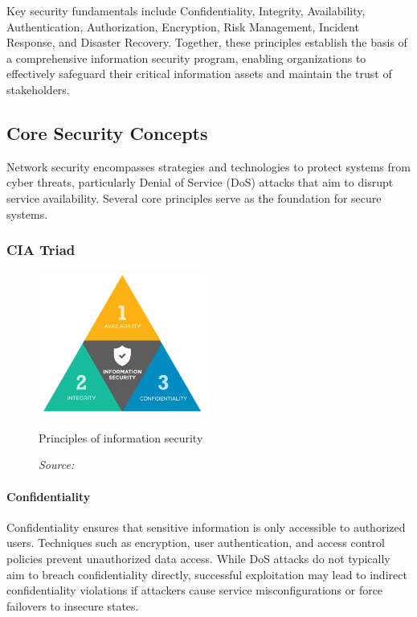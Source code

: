 \documentclass[16pt]{report}
\begin{document}
Key security fundamentals include Confidentiality, Integrity, Availability, Authentication, Authorization, Encryption, Risk Management, Incident Response, and Disaster Recovery. Together, these principles establish the basis of a comprehensive information security program, enabling organizations to effectively safeguard their critical information assets and maintain the trust of stakeholders.\cite{ibm_security_fundamental}

\subsection{Core Security Concepts}
Network security encompasses strategies and technologies to protect systems from cyber threats, particularly Denial of Service (DoS) attacks that aim to disrupt service availability. Several core principles serve as the foundation for secure systems.

\subsubsection{CIA Triad}
\begin{figure}[ht]
    \centering
    \includegraphics[width=0.5\textwidth]{images/CIA-graph.png}
    \caption{Principles of information security}
    \caption*{\footnotesize\textit{Source: \cite{ibm_principles_of_information_security}}}
    \label{fig:cia-graph}
\end{figure}

\paragraph{Confidentiality} 
Confidentiality ensures that sensitive information is only accessible to authorized users. Techniques such as encryption, user authentication, and access control policies prevent unauthorized data access. While DoS attacks do not typically aim to breach confidentiality directly, successful exploitation may lead to indirect confidentiality violations if attackers cause service misconfigurations or force failovers to insecure states.
\end{document}
